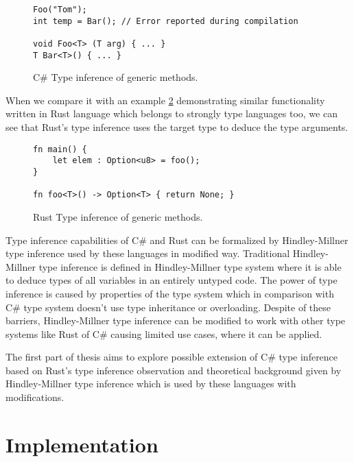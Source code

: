\par
\begin{figure}
\begin{lstlisting}
Foo("Tom");
int temp = Bar(); // Error reported during compilation

void Foo<T> (T arg) { ... }
T Bar<T>() { ... }
\end{lstlisting}
\caption{C\# Type inference of generic methods.}
\label{img02:csharp_infer_meth}
\end{figure}
\par
When we compare it with an example \ref{img03:rust_infer_meth} demonstrating similar functionality written in Rust language which belongs to strongly type languages too, we can see that Rust's type inference uses the target type to deduce the type arguments.
\begin{figure}
\begin{lstlisting}
fn main() {
    let elem : Option<u8> = foo(); 
}

fn foo<T>() -> Option<T> { return None; }
\end{lstlisting}
\caption{Rust Type inference of generic methods.}
\label{img03:rust_infer_meth}
\end{figure}
\par
{}
Type inference capabilities of C\# and Rust can be formalized by Hindley-Millner type inference \cite{online:yHM} used by these languages in modified way.
Traditional Hindley-Millner type inference is defined in Hindley-Millner type system \cite{online:wikiHM} where it is able to deduce types of all variables in an entirely untyped code.
The power of type inference is caused by properties of the type system which in comparison with C\# type system doesn't use type inheritance or overloading.
Despite of these barriers, Hindley-Millner type inference can be modified to work with other type systems like Rust of C\# causing limited use cases, where it can be applied.
\par
{}
The first part of thesis aims to explore possible extension of C\# type inference based on Rust's type inference observation and theoretical background given by Hindley-Millner type inference which is used by these languages with modifications.

\section{Implementation}

